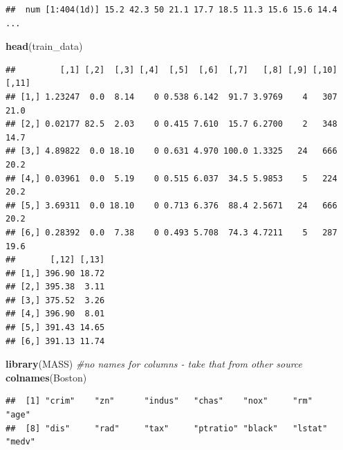 \documentclass[10pt,ignorenonframetext,]{beamer}
\newenvironment{Shaded}{\begin{snugshade}}{\end{snugshade}}
\newcommand{\CommentTok}[1]{\textcolor[rgb]{0.56,0.35,0.01}{\textit{#1}}}
\newcommand{\KeywordTok}[1]{\textcolor[rgb]{0.13,0.29,0.53}{\textbf{#1}}}
\newcommand{\NormalTok}[1]{#1}
\newcommand{\OperatorTok}[1]{\textcolor[rgb]{0.81,0.36,0.00}{\textbf{#1}}}
\newcommand{\StringTok}[1]{\textcolor[rgb]{0.31,0.60,0.02}{#1}}
\begin{document}
\begin{frame}[fragile]

\scriptsize

\begin{Shaded}
\end{Shaded}

\begin{verbatim}
##  num [1:404(1d)] 15.2 42.3 50 21.1 17.7 18.5 11.3 15.6 15.6 14.4 ...
\end{verbatim}

\begin{Shaded}
\begin{Highlighting}[]
\KeywordTok{head}\NormalTok{(train_data)}
\end{Highlighting}
\end{Shaded}

\begin{verbatim}
##         [,1] [,2]  [,3] [,4]  [,5]  [,6]  [,7]   [,8] [,9] [,10] [,11]
## [1,] 1.23247  0.0  8.14    0 0.538 6.142  91.7 3.9769    4   307  21.0
## [2,] 0.02177 82.5  2.03    0 0.415 7.610  15.7 6.2700    2   348  14.7
## [3,] 4.89822  0.0 18.10    0 0.631 4.970 100.0 1.3325   24   666  20.2
## [4,] 0.03961  0.0  5.19    0 0.515 6.037  34.5 5.9853    5   224  20.2
## [5,] 3.69311  0.0 18.10    0 0.713 6.376  88.4 2.5671   24   666  20.2
## [6,] 0.28392  0.0  7.38    0 0.493 5.708  74.3 4.7211    5   287  19.6
##       [,12] [,13]
## [1,] 396.90 18.72
## [2,] 395.38  3.11
## [3,] 375.52  3.26
## [4,] 396.90  8.01
## [5,] 391.43 14.65
## [6,] 391.13 11.74
\end{verbatim}

\begin{Shaded}
\begin{Highlighting}[]
\KeywordTok{library}\NormalTok{(MASS)  }\CommentTok{#no names for columns - take that from other source}
\KeywordTok{colnames}\NormalTok{(Boston)}
\end{Highlighting}
\end{Shaded}

\begin{verbatim}
##  [1] "crim"    "zn"      "indus"   "chas"    "nox"     "rm"      "age"    
##  [8] "dis"     "rad"     "tax"     "ptratio" "black"   "lstat"   "medv"
\end{verbatim}


\end{frame}
\end{document}
